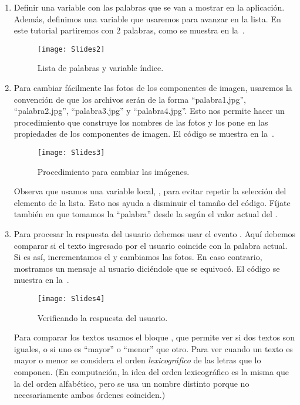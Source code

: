\begin{enumerate}

\item Definir una variable  con las palabras
  que se van a mostrar en la aplicación. Además, definimos una
  variable  que usaremos para avanzar en la lista. En este tutorial partiremos
  con 2 palabras, como se muestra en la~.

\begin{figure}[H]
  \centering
  \texttt{[image: Slides2]}
  \caption{Lista de palabras y variable índice.}
  \label{fig:Slides2}
\end{figure}

\item Para cambiar fácilmente las fotos de los componentes de imagen,
  usaremos la convención de que los archivos serán de la forma
  ``palabra1.jpg'', ``palabra2.jpg'', ``palabra3.jpg'' y
  ``palabra4.jpg''. Esto nos permite hacer un procedimiento que
  construye los nombres de las fotos y los pone en las propiedades
   de los componentes de imagen. El código se muestra
  en la~.

\begin{figure}[H]
  \centering
  \texttt{[image: Slides3]}
  \caption{Procedimiento para cambiar las imágenes.}
  \label{fig:Slides3}
\end{figure}

Observa que usamos una variable local, , para
evitar repetir la selección del elemento de la lista. Esto nos ayuda a
disminuir el tamaño del código. Fíjate también en que tomamos la
``palabra'' desde la  según el valor actual
del .

\item Para procesar la respuesta del usuario debemos usar el evento
  . Aquí debemos comparar si el texto
  ingresado por el usuario coincide con la palabra actual. Si es así,
  incrementamos el  y cambiamos las fotos. En caso
  contrario, mostramos un mensaje al usuario diciéndole que se
  equivocó. El código se muestra en la~.

\begin{figure}[H]
  \centering
  \texttt{[image: Slides4]}
  \caption{Verificando la respuesta del usuario.}
  \label{fig:Slides4}
\end{figure}

Para comparar los textos usamos el bloque , que
permite ver si dos textos son iguales, o si uno es ``mayor'' o
``menor'' que otro. Para ver cuando un texto es mayor o menor se
considera el orden \emph{lexicográfico} de las letras que lo
componen. (En computación, la idea del orden lexicográfico es la misma
que la del orden alfabético, pero se usa un nombre distinto porque no
necesariamente ambos órdenes coinciden.)

\end{enumerate}

